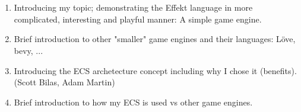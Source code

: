 \chapter{}\label{chap:refs}

\begin{enumerate}
\item Introducing my topic; demonstrating the Effekt language in more complicated, interesting and playful manner: A simple game engine.
\item Brief introduction to other "smaller" game engines and their languages: Löve, bevy, ...
\item Introducing the ECS archetecture concept including why I chose it (benefits). (Scott Bilas, Adam Martin)
\item Brief introduction to how my ECS is used vs other game engines.
\end{enumerate}
